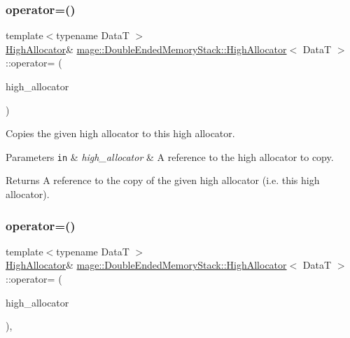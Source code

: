 \subsubsection{\texorpdfstring{operator=()}{operator=()}\hspace{0.1cm}{\footnotesize\ttfamily [1/2]}}
{\footnotesize\ttfamily template$<$typename DataT $>$ \\
\hyperlink{structmage_1_1_double_ended_memory_stack_1_1_high_allocator}{High\+Allocator}\& \hyperlink{structmage_1_1_double_ended_memory_stack_1_1_high_allocator}{mage\+::\+Double\+Ended\+Memory\+Stack\+::\+High\+Allocator}$<$ DataT $>$\+::operator= (\begin{DoxyParamCaption}\item[{const \hyperlink{structmage_1_1_double_ended_memory_stack_1_1_high_allocator}{High\+Allocator}$<$ DataT $>$ \&}]{high\+\_\+allocator }\end{DoxyParamCaption})\hspace{0.3cm}{\ttfamily [delete]}}

Copies the given high allocator to this high allocator.


\begin{DoxyParams}[1]{Parameters}
\mbox{\tt in}  & {\em high\+\_\+allocator} & A reference to the high allocator to copy. \\
\hline
\end{DoxyParams}
\begin{DoxyReturn}{Returns}
A reference to the copy of the given high allocator (i.\+e. this high allocator). 
\end{DoxyReturn}
\hypertarget{structmage_1_1_double_ended_memory_stack_1_1_high_allocator_aa596d086d499f6c9369edecc4aa22882}{}\label{structmage_1_1_double_ended_memory_stack_1_1_high_allocator_aa596d086d499f6c9369edecc4aa22882} 
\subsubsection{\texorpdfstring{operator=()}{operator=()}\hspace{0.1cm}{\footnotesize\ttfamily [2/2]}}
{\footnotesize\ttfamily template$<$typename DataT $>$ \\
\hyperlink{structmage_1_1_double_ended_memory_stack_1_1_high_allocator}{High\+Allocator}\& \hyperlink{structmage_1_1_double_ended_memory_stack_1_1_high_allocator}{mage\+::\+Double\+Ended\+Memory\+Stack\+::\+High\+Allocator}$<$ DataT $>$\+::operator= (\begin{DoxyParamCaption}\item[{\hyperlink{structmage_1_1_double_ended_memory_stack_1_1_high_allocator}{High\+Allocator}$<$ DataT $>$ \&\&}]{high\+\_\+allocator }\end{DoxyParamCaption})\hspace{0.3cm}{\ttfamily [default]}, {\ttfamily [noexcept]}}

